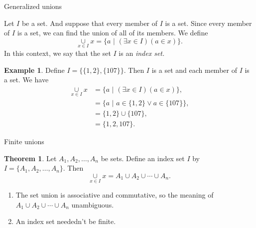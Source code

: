 \documentclass[fleqn]{beamer}
\theoremstyle{definition}
\newtheorem{myex}{Example}
\newtheorem{myth}{Theorem}
\begin{document}
\begin{frame}{Generalized unions}

Let \(I\) be a set. And suppose that every member of \(I\) is a set.  Since every member of \(I\) is a set, we can find the union of all of its members. We define
\[
    \underset{x \in I}{\cup} x  = \{ a  \, \,  | \, \, (\exists x \in I)(a \in x) \}.
\]
In this context, we say that the set \(I\) is an \emph{index set.}

\begin{myex}  Define \(I = \{ \{1,2\}, \{107\} \} \). Then \(I\) is a set and each member of \(I\) is a set. We have
\begin{align*}
 \underset{x \in I}{\cup} x  &= \{ a  \, \,  | \, \, (\exists x \in I)(a \in x) \}, \\
                                                   &= \{ a  \, \,  | \, \,   a \in   \{1,2\}  \lor    a \in   \{107\} \}, \\
                                                   &= \{1,2\}  \cup \{107\}, \\
                                                   &= \{1,2,107\}.
\end{align*}

\end{myex}
\end{frame}

\begin{frame}{Finite unions}
\begin{myth} Let \(A_1, A_2, \dots, A_n\) be sets.  Define an index set \(I\) by  \(I = \{A_1, A_2, \dots, A_n \} \). Then
\[
   \underset{x \in I}{\cup} x = A_1 \cup A_2 \cup \cdots \cup A_n.
\]
\end{myth}
\begin{enumerate}
  \item The set union is associative and commutative, so  the meaning of \(A_1 \cup A_2 \cup \cdots \cup A_n \) unambiguous. 
  
  \item An index set neededn't be finite.
\end{enumerate}
\end{frame}
\end{document}
